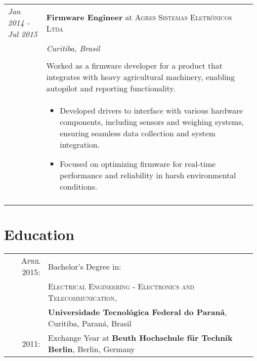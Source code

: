 \documentclass[a4paper,10pt]{article}
\begin{document}
    \begin{tabular}{@{} p{2.8cm} | p{12.2cm} @{}}
        \emph{Jan 2014 - Jul 2015}
        &\textbf{Firmware Engineer} at \textsc
        {Agres Sistemas Eletrônicos Ltda} \\

        &\emph
        {Curitiba, Brasil} \\ \\
        &\normalsize
        {
            Worked as a firmware developer for a product that integrates
            with heavy agricultural machinery, enabling autopilot and
            reporting functionality.
        } \\
        & \begin{itemize}[leftmargin=*]
            \item Developed drivers to interface with various hardware
            components, including sensors and weighing systems, ensuring
            seamless data collection and system integration.

            \item Focused on optimizing firmware for real-time performance
            and reliability in harsh environmental conditions.

        \end{itemize} \\
        \multicolumn{2}{c}{}
    \end{tabular}

\section*{Education}
    \begin{tabular}{rl}
        \textsc{April 2015:}  & Bachelor's Degree in: \\
                            &\textsc
                            {Electrical Engineering -
                                Electronics and Telecommunication}, \\

                            &\textbf
                            {Universidade Tecnológica Federal do Paraná},
                            Curitiba, Paraná, Brasil \\

        \textsc{2011:}       & Exchange Year at \textbf
                            {Beuth Hochschule für Technik Berlin},
                            Berlin, Germany \\
    \end{tabular}
\end{document}
